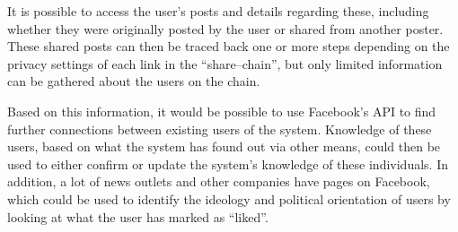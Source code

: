It is possible to access the user's posts and details regarding these, including whether they were originally
posted by the user or shared from another poster.
These shared posts can then be traced back one or more steps depending on the
privacy settings of each link in the ``share--chain'', but only limited information can be gathered about the users on the chain.\nl

Based on this information, it would be possible to use Facebook's API to find
further connections between existing users of the system.
Knowledge of these users, based on what the system has found out via other means, could then be used to either confirm
or update the system's knowledge of these individuals.
In addition, a lot of news outlets and other companies have pages on Facebook,
which could be used to identify the ideology and political orientation of
users by looking at what the user has marked as ``liked''.
